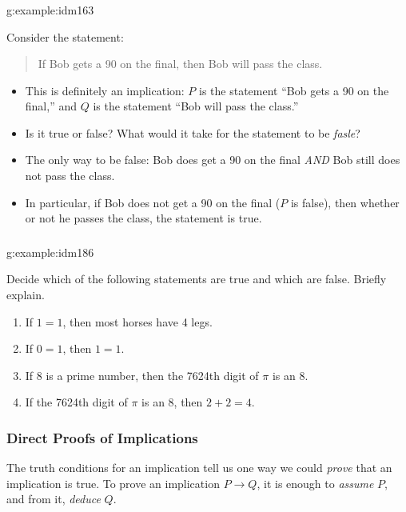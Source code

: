 \documentclass[11pt, compress]{beamer}
\newcommand{\imp}{\rightarrow}
\begin{document}
\begin{frame}
\frametitle{}
\begin{example}{}{g:example:idm163}%

Consider the statement:\begin{quote}%

If Bob gets a 90 on the final, then Bob will pass the class.\end{quote}

\pause 
\begin{itemize}[<+->]
\item{}
This is definitely an implication: \(P\) is the statement ``Bob gets a 90 on the final,'' and \(Q\) is the statement ``Bob will pass the class.''

\item{}
Is it true or false?  What would it take for the statement to be \emph{fasle}?

\item{}
The only way to be false: Bob does get a 90 on the final \emph{AND} Bob still does not pass the class.

\item{}
In particular, if Bob does not get a 90 on the final (\(P\) is false), then whether or not he passes the class, the statement is true.
\end{itemize}\end{example}
\end{frame}
 
\begin{frame}
\frametitle{}
\begin{example}{}{g:example:idm186}%

Decide which of the following statements are true and which are false. Briefly explain.\begin{enumerate}
\item{}
If \(1=1\), then most horses have 4 legs.

\item{}
If \(0=1\), then \(1=1\).

\item{}
If 8 is a prime number, then the 7624th digit of \(\pi\) is an 8.

\item{}
If the 7624th digit of \(\pi\) is an 8, then \(2+2 = 4\).
\end{enumerate}\end{example}
\end{frame}
 
\begin{frame}
\frametitle{Direct Proofs of Implications}
 
The truth conditions for an implication tell us one way we could \emph{prove} that an implication is true. 
\pause 
To prove an implication \(P \imp Q\), it is enough to \emph{assume} \(P\), and from it, \emph{deduce} \(Q\).\end{frame}
 
\end{document}
